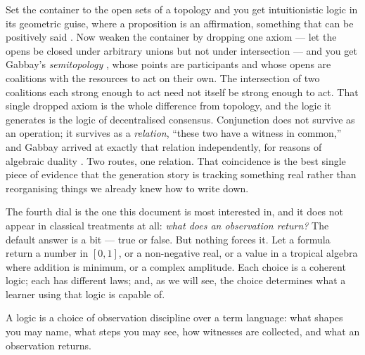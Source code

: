 Set the container to the open sets of a topology and you get intuitionistic logic
in its geometric guise, where a proposition is an affirmation, something that can
be positively said \cite{Vickers89}. Now weaken the container by dropping one
axiom --- let the opens be closed under arbitrary unions but not under
intersection --- and you get Gabbay's \emph{semitopology} \cite{Gabbay25}, whose
points are participants and whose opens are coalitions with the resources to act
on their own. The intersection of two coalitions each strong enough to act need
not itself be strong enough to act. That single dropped axiom is the whole
difference from topology, and the logic it generates is the logic of decentralised
consensus. Conjunction does not survive as an operation; it survives as a
\emph{relation}, ``these two have a witness in common,'' and Gabbay arrived at
exactly that relation independently, for reasons of algebraic duality
\cite{GabbaySemiframes}. Two routes, one relation. That coincidence is the best
single piece of evidence that the generation story is tracking something real
rather than reorganising things we already knew how to write down.

The fourth dial is the one this document is most interested in, and it does not
appear in classical treatments at all: \emph{what does an observation return?}
The default answer is a bit --- true or false. But nothing forces it. Let a
formula return a number in $[0,1]$, or a non-negative real, or a value in a
tropical algebra where addition is minimum, or a complex amplitude. Each choice is
a coherent logic; each has different laws; and, as we will see, the choice
determines what a learner using that logic is capable of.

\begin{slogan}
A logic is a choice of observation discipline over a term language: what shapes
you may name, what steps you may see, how witnesses are collected, and what an
observation returns.
\end{slogan}

